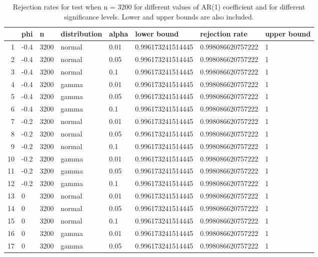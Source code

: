 \begin{table}[ht]
\centering
\caption{Rejection rates for test when n = 3200 for 
                   different values of AR(1) coefficient and for different 
                   significance levels. Lower and upper bounds are also 
                   included.} 
\label{table:rr_3200}
\begin{tabular}{rlllllll}
  \hline
 & phi & n & distribution & alpha & lower bound & rejection rate & upper bound \\ 
  \hline
1 & -0.4 & 3200 & normal & 0.01 & 0.996173241514445 & 0.998086620757222 & 1 \\ 
  2 & -0.4 & 3200 & normal & 0.05 & 0.996173241514445 & 0.998086620757222 & 1 \\ 
  3 & -0.4 & 3200 & normal & 0.1 & 0.996173241514445 & 0.998086620757222 & 1 \\ 
  4 & -0.4 & 3200 & gamma & 0.01 & 0.996173241514445 & 0.998086620757222 & 1 \\ 
  5 & -0.4 & 3200 & gamma & 0.05 & 0.996173241514445 & 0.998086620757222 & 1 \\ 
  6 & -0.4 & 3200 & gamma & 0.1 & 0.996173241514445 & 0.998086620757222 & 1 \\ 
  7 & -0.2 & 3200 & normal & 0.01 & 0.996173241514445 & 0.998086620757222 & 1 \\ 
  8 & -0.2 & 3200 & normal & 0.05 & 0.996173241514445 & 0.998086620757222 & 1 \\ 
  9 & -0.2 & 3200 & normal & 0.1 & 0.996173241514445 & 0.998086620757222 & 1 \\ 
  10 & -0.2 & 3200 & gamma & 0.01 & 0.996173241514445 & 0.998086620757222 & 1 \\ 
  11 & -0.2 & 3200 & gamma & 0.05 & 0.996173241514445 & 0.998086620757222 & 1 \\ 
  12 & -0.2 & 3200 & gamma & 0.1 & 0.996173241514445 & 0.998086620757222 & 1 \\ 
  13 & 0 & 3200 & normal & 0.01 & 0.996173241514445 & 0.998086620757222 & 1 \\ 
  14 & 0 & 3200 & normal & 0.05 & 0.996173241514445 & 0.998086620757222 & 1 \\ 
  15 & 0 & 3200 & normal & 0.1 & 0.996173241514445 & 0.998086620757222 & 1 \\ 
  16 & 0 & 3200 & gamma & 0.01 & 0.996173241514445 & 0.998086620757222 & 1 \\ 
  17 & 0 & 3200 & gamma & 0.05 & 0.996173241514445 & 0.998086620757222 & 1 \\ 

\end{tabular}
\end{table}
